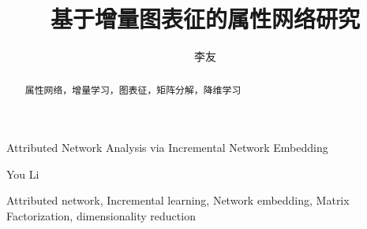 \documentclass{sysuthesis} %
\numberwithin{algorithm}{chapter}
\theoremstyle{plain}
\theoremstyle{definition}
\theoremstyle{definition}
\begin{document}
\title{基于增量图表征的属性网络研究}{}{Attributed Network Analysis via Incremental Network Embedding}{}

\author{李友}{You Li}




\maketitle

\begin{abstract}{属性网络，增量学习，图表征，矩阵分解，降维学习}
  
\end{abstract}

\begin{englishabstract}{Attributed network, Incremental learning, Network embedding, Matrix Factorization, dimensionality reduction}
  
\end{englishabstract}

\tableofcontents


\begin{Main} %










%

%

\end{Main} %






\newpage
\printindex %
\end{document}
